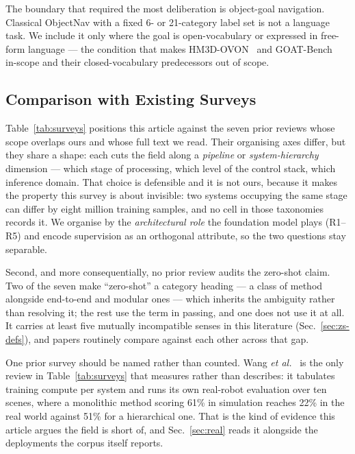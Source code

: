 \documentclass[journal]{IEEEtran}
\begin{document}
The boundary that required the most deliberation is object-goal
navigation. Classical ObjectNav with a fixed 6- or 21-category label set is
not a language task. We include it only where the goal is open-vocabulary
or expressed in free-form language --- the condition that makes
HM3D-OVON~\cite{yokoyama2024ovon} and GOAT-Bench~\cite{khanna2024goat}
in-scope and their closed-vocabulary predecessors out of scope.

\subsection{Comparison with Existing Surveys}
Table~\ref{tab:surveys} positions this article against the seven prior
reviews whose scope overlaps ours and whose full text we read. Their
organising axes differ, but they share a shape: each cuts the field along a
\emph{pipeline} or \emph{system-hierarchy} dimension --- which stage of
processing, which level of the control stack, which inference domain. That
choice is defensible and it is not ours, because it makes the property this
survey is about invisible: two systems occupying the same stage can differ
by eight million training samples, and no cell in those taxonomies records
it. We organise by the \emph{architectural role} the foundation model plays
(R1--R5) and encode supervision as an orthogonal attribute, so the two
questions stay separable.

Second, and more consequentially, no prior review audits the zero-shot
claim. Two of the seven make ``zero-shot'' a category heading --- a class
of method alongside end-to-end and modular ones --- which inherits the
ambiguity rather than resolving it; the rest use the term in passing, and
one does not use it at all. It carries at least five mutually incompatible
senses in this literature (Sec.~\ref{sec:zs-defs}), and papers routinely
compare against each other across that gap.

One prior survey should be named rather than counted.
Wang \emph{et al.}~\cite{wang2026comprehensive} is the only review in
Table~\ref{tab:surveys} that measures rather than describes: it tabulates
training compute per system and runs its own real-robot evaluation over ten
scenes, where a monolithic method scoring 61\% in simulation reaches 22\% in
the real world against 51\% for a hierarchical one. That is the kind of
evidence this article argues the field is short of, and
Sec.~\ref{sec:real} reads it alongside the deployments the corpus itself
reports.
\end{document}
